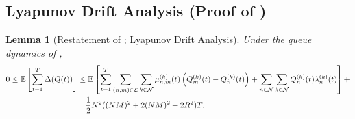 \documentclass[11pt,fullpage,letterpaper]{article} %
\newtheorem{lemma}[theorem]{Lemma}
\renewcommand{\bm}[1]{#1}%
\newcommand{\E}{\operatornamewithlimits{\mathbb{E}}}
\newcommand{\mN}{{\mathcal N}}
\newcommand{\mL}{{\mathcal L}}
\begin{document}
\subsection{Lyapunov Drift Analysis (Proof of )}
\label{sec:multi-hop stability Lyapunov appendix}
\begin{lemma}[Restatement of ; Lyapunov Drift Analysis]
Under the queue dynamics of ,
\begin{align*}
0\le \E\left [\sum_{t=1}^T \Delta(\bm Q(t))\right ]&\le \E\left [\sum_{t=1}^T \sum_{(n,m)\in \mL} \sum_{k\in \mN} \mu_{n,m}^{(k)}(t)\left (Q_m^{(k)}(t)-Q_n^{(k)}(t)\right ) + \sum_{n\in \mN} \sum_{k\in \mN} Q_n^{(k)}(t) \lambda_n^{(k)}(t)\right ] + \nonumber \\
&\quad \frac 12 N^2 ((NM)^2+2(NM)^2+2R^2) T.
\end{align*}
\end{lemma}
\end{document}
